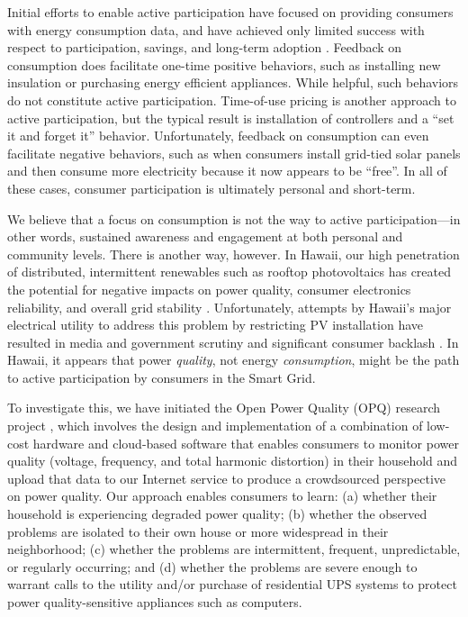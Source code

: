 Initial efforts to enable active participation have focused on providing consumers with energy consumption data, and have achieved only limited success with respect to participation, savings, and long-term adoption \cite{Darby06,Faruqui09,Foster2012}.  Feedback on consumption does facilitate one-time positive behaviors, such as installing new insulation or purchasing energy efficient appliances. While helpful, such behaviors do not constitute active participation.    Time-of-use pricing is another approach to active participation, but the typical result is installation of controllers and a ``set it and forget it'' behavior.  Unfortunately, feedback on consumption can even facilitate negative behaviors, such as when consumers install grid-tied solar panels and then consume more electricity because it now appears to be ``free''.  In all of these cases, consumer participation is ultimately personal and short-term.

We believe that a focus on consumption is not the way to active participation---in other words, sustained awareness and engagement at both personal and community levels. There is another way, however. In Hawaii, our high penetration of distributed, intermittent renewables such as rooftop photovoltaics has created the potential for negative impacts on power quality, consumer electronics reliability, and overall grid stability \cite{Rodriguez2010,Laskar2012}. Unfortunately, attempts by Hawaii's major electrical utility to address this problem by restricting PV installation have resulted in media and government scrutiny and significant consumer backlash \cite{Yonan2013,Zunin2013,Elston2013,Cocke2013,Cocke2012}.  In Hawaii, it appears that power {\em quality}, not energy {\em consumption}, might be the path to active participation by consumers in the Smart Grid.

To investigate this, we have initiated the Open Power Quality (OPQ) research project \cite{opq-site}, which involves the design and implementation of a combination of low-cost hardware and cloud-based software that enables consumers to monitor power quality (voltage, frequency, and total harmonic distortion) in their household and upload that data to our Internet service to produce a crowdsourced perspective on power quality.  Our approach enables consumers to learn: (a) whether their household is experiencing degraded power quality; (b) whether the observed problems are isolated to their own house or more widespread in their neighborhood;  (c) whether the problems are intermittent, frequent, unpredictable, or regularly occurring;  and (d) whether the problems are severe enough to warrant calls to the utility and/or purchase of residential UPS systems to protect power quality-sensitive appliances such as computers. 


